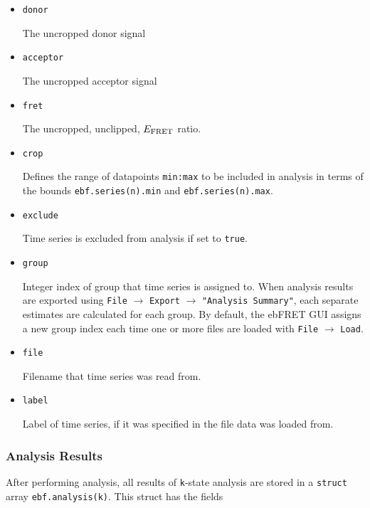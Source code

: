 \documentclass[12pt,article,oldfontcommands]{memoir}
\begin{document}
\begin{itemize}
\item \texttt{donor}

The uncropped donor signal

\item \texttt{acceptor}

The uncropped acceptor signal

\item \texttt{fret}

The uncropped, unclipped, $E_{\rm FRET}$ ratio.

\item \texttt{crop}

Defines the range of datapoints \texttt{min:max} to be included in analysis in terms of the bounds \texttt{ebf.series(n).min} and \texttt{ebf.series(n).max}.

\item \texttt{exclude}

Time series is excluded from analysis if set to \texttt{true}.

\item \texttt{group}

Integer index of group that time series is assigned to. When analysis results are exported using \texttt{File} $\to$ \texttt{Export} $\to$ \texttt{"Analysis Summary"}, each separate estimates are calculated for each group. By default, the ebFRET GUI assigns a new group index each time one or more files are loaded with \texttt{File} $\to$ \texttt{Load}.

\item \texttt{file}

Filename that time series was read from.

\item \texttt{label}

Label of time series, if it was specified in the file data was loaded from.

\end{itemize}

\subsubsection{Analysis Results}

After performing analysis, all results of \texttt{k}-state analysis are stored in a \texttt{struct} array \texttt{ebf.analysis(k)}. This struct has the fields
\end{document}
